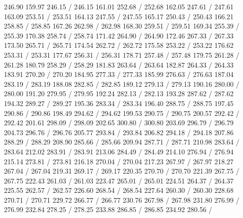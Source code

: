 { 246.90 159.97 246.15 /
 246.15 161.01 252.68 /
 252.68 162.05 247.61 /
 247.61 163.09 253.51 /
 253.51 164.13 247.55 /
 247.55 165.17 250.43 /
 250.43 166.21 258.85 /
 258.85 167.26 262.98 /
 262.98 168.30 259.51 /
 259.51 169.34 255.39 /
 255.39 170.38 258.74 /
 258.74 171.42 264.90 /
 264.90 172.46 267.33 /
 267.33 173.50 265.71 /
 265.71 174.54 262.72 /
 262.72 175.58 253.22 /
 253.22 176.62 253.31 /
 253.31 177.67 256.31 /
 256.31 178.71 257.48 /
 257.48 179.75 261.28 /
 261.28 180.79 258.29 /
 258.29 181.83 263.64 /
 263.64 182.87 264.33 /
 264.33 183.91 270.20 /
 270.20 184.95 277.33 /
 277.33 185.99 276.63 /
 276.63 187.04 283.19 /
 283.19 188.08 282.85 /
 282.85 189.12 279.13 /
 279.13 190.16 280.00 /
 280.00 191.20 279.95 /
 279.95 192.24 282.13 /
 282.13 193.28 287.62 /
 287.62 194.32 289.27 /
 289.27 195.36 283.34 /
 283.34 196.40 288.75 /
 288.75 197.45 290.86 /
 290.86 198.49 294.62 /
 294.62 199.53 290.75 /
 290.75 200.57 292.42 /
 292.42 201.61 298.09 /
 298.09 202.65 300.80 /
 300.80 203.69 296.79 /
 296.79 204.73 296.76 /
 296.76 205.77 293.84 /
 293.84 206.82 294.18 /
 294.18 207.86 288.29 /
 288.29 208.90 285.66 /
 285.66 209.94 287.71 /
 287.71 210.98 283.64 /
 283.64 212.02 283.91 /
 283.91 213.06 284.49 /
 284.49 214.10 276.94 /
 276.94 215.14 273.81 /
 273.81 216.18 270.04 /
 270.04 217.23 267.97 /
 267.97 218.27 267.04 /
 267.04 219.31 269.17 /
 269.17 220.35 270.70 /
 270.70 221.39 267.75 /
 267.75 222.43 261.03 /
 261.03 223.47 265.01 /
 265.01 224.51 264.37 /
 264.37 225.55 262.57 /
 262.57 226.60 268.54 /
 268.54 227.64 260.30 /
 260.30 228.68 270.71 /
 270.71 229.72 266.77 /
 266.77 230.76 267.98 /
 267.98 231.80 276.99 /
 276.99 232.84 278.25 /
 278.25 233.88 286.85 /
 286.85 234.92 280.56 /
}
